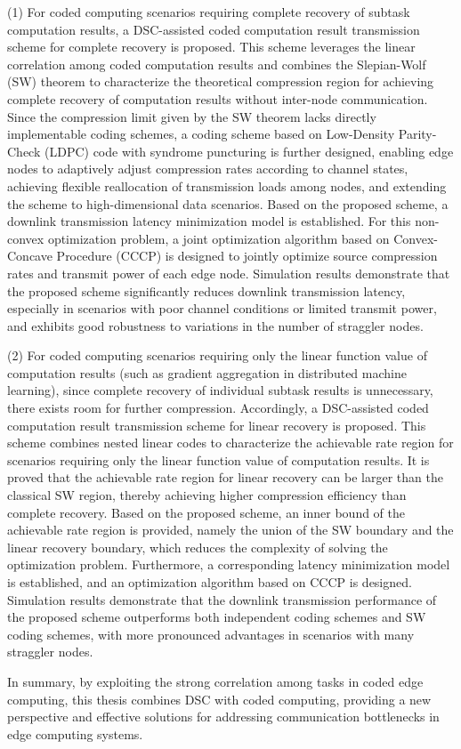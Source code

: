 (1) For coded computing scenarios requiring complete recovery of subtask computation results, a DSC-assisted coded computation result transmission scheme for complete recovery is proposed. This scheme leverages the linear correlation among coded computation results and combines the Slepian-Wolf (SW) theorem to characterize the theoretical compression region for achieving complete recovery of computation results without inter-node communication. Since the compression limit given by the SW theorem lacks directly implementable coding schemes, a coding scheme based on Low-Density Parity-Check (LDPC) code with syndrome puncturing is further designed, enabling edge nodes to adaptively adjust compression rates according to channel states, achieving flexible reallocation of transmission loads among nodes, and extending the scheme to high-dimensional data scenarios. Based on the proposed scheme, a downlink transmission latency minimization model is established. For this non-convex optimization problem, a joint optimization algorithm based on Convex-Concave Procedure (CCCP) is designed to jointly optimize source compression rates and transmit power of each edge node. Simulation results demonstrate that the proposed scheme significantly reduces downlink transmission latency, especially in scenarios with poor channel conditions or limited transmit power, and exhibits good robustness to variations in the number of straggler nodes.

(2) For coded computing scenarios requiring only the linear function value of computation results (such as gradient aggregation in distributed machine learning), since complete recovery of individual subtask results is unnecessary, there exists room for further compression. Accordingly, a DSC-assisted coded computation result transmission scheme for linear recovery is proposed. This scheme combines nested linear codes to characterize the achievable rate region for scenarios requiring only the linear function value of computation results. It is proved that the achievable rate region for linear recovery can be larger than the classical SW region, thereby achieving higher compression efficiency than complete recovery. Based on the proposed scheme, an inner bound of the achievable rate region is provided, namely the union of the SW boundary and the linear recovery boundary, which reduces the complexity of solving the optimization problem. Furthermore, a corresponding latency minimization model is established, and an optimization algorithm based on CCCP is designed. Simulation results demonstrate that the downlink transmission performance of the proposed scheme outperforms both independent coding schemes and SW coding schemes, with more pronounced advantages in scenarios with many straggler nodes.

In summary, by exploiting the strong correlation among tasks in coded edge computing, this thesis combines DSC with coded computing, providing a new perspective and effective solutions for addressing communication bottlenecks in edge computing systems.
